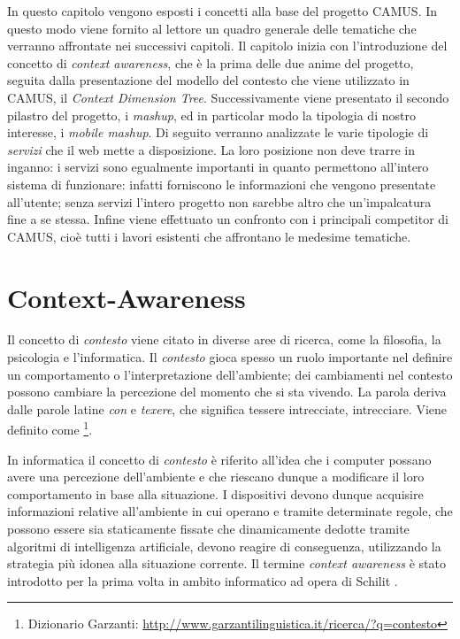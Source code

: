 In questo capitolo vengono esposti i concetti alla base del progetto CAMUS. In questo modo viene fornito al lettore un quadro generale delle tematiche che verranno affrontate nei successivi capitoli. Il capitolo inizia con l'introduzione del concetto di \emph{context awareness}, che è la prima delle due anime del progetto, seguita dalla presentazione del modello del contesto che viene utilizzato in CAMUS, il \emph{Context Dimension Tree}. Successivamente viene presentato il secondo pilastro del progetto, i \emph{mashup}, ed in particolar modo la tipologia di nostro interesse, i \emph{mobile mashup}. Di seguito verranno analizzate le varie tipologie di \emph{servizi} che il web mette a disposizione. La loro posizione non deve trarre in inganno: i servizi sono egualmente importanti in quanto permettono all'intero sistema di funzionare: infatti forniscono le informazioni che vengono presentate all'utente; senza servizi l'intero progetto non sarebbe altro che un'impalcatura fine a se stessa. Infine viene effettuato un confronto con i principali competitor di CAMUS, cioè tutti i lavori esistenti che affrontano le medesime tematiche.

\section{Context-Awareness\label{sec:context-awareness}}

Il concetto di \emph{contesto} viene citato in diverse aree di ricerca, come la filosofia, la psicologia e l'informatica. Il \emph{contesto} gioca spesso un ruolo importante nel definire un comportamento o l'interpretazione dell'ambiente; dei cambiamenti nel contesto possono cambiare la percezione del momento che si sta vivendo. La parola  deriva dalle parole latine \emph{con} e \emph{texere}, che significa tessere intrecciate, intrecciare. Viene definito come \footnote{Dizionario Garzanti: \url{http://www.garzantilinguistica.it/ricerca/?q=contesto}}.

In informatica il concetto di \emph{contesto} è riferito all'idea che i computer possano avere una percezione dell'ambiente e che riescano dunque a modificare il loro comportamento in base alla situazione. I dispositivi devono dunque acquisire informazioni relative all'ambiente in cui operano e tramite determinate regole, che possono essere sia staticamente fissate che dinamicamente dedotte tramite algoritmi di intelligenza artificiale, devono reagire di conseguenza, utilizzando la strategia più idonea alla situazione corrente. Il termine \emph{context awareness} è stato introdotto per la prima volta in ambito informatico ad opera di Schilit \cite{schilit1994context}\cite{schilit1994disseminating}.


